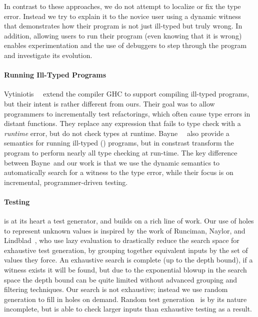 In contrast to these approaches, we do not attempt to localize or fix
the type error. Instead we try to explain it to the novice user using a
dynamic witness that demonstrates how their program is not just
ill-typed but truly wrong. In addition, allowing users to run their
program (even knowing that it is wrong) enables experimentation and the
use of debuggers to step through the program and investigate its
evolution.

\paragraph{Running Ill-Typed Programs}
\label{sec:running-ill-typed}
Vytiniotis~\etal~\cite{Vytiniotis2012-gh} extend the \haskell
compiler GHC to support compiling ill-typed programs, but their intent
is rather different from ours. Their goal was to allow programmers to
incrementally test refactorings, which often cause type errors in
distant functions. They replace any expression that fails to type
check with a \emph{runtime} error, but do not check types
at runtime.
%
Bayne~\etal~\cite{Bayne2011-cn} also provide a semantics for running
ill-typed (\java) programs, but in constrast transform the program to
perform nearly all type checking at run-time. The key difference between
Bayne~\etal and our work is that we use the dynamic semantics to
automatically search for a witness to the type error, while their focus
is on incremental, programmer-driven testing.

\paragraph{Testing}
\label{sec:testing}
\nanomaly is at its heart a test generator, and builds on a rich line of
work.
%
Our use of holes to represent unknown values is inspired by the work of
Runciman, Naylor, and Lindblad~\cite{Runciman2008-ka,Naylor2007-mi,Lindblad2007-oy},
%
who use lazy evaluation to drastically reduce the search space for
exhaustive test generation, by grouping together equivalent inputs by
the set of values they force. An exhaustive search is complete (up to
the depth bound), if a witness exists it will be found, but due to the
exponential blowup in the search space the depth bound can be quite
limited without advanced grouping and filtering techniques.
%
Our search is not exhaustive; instead we use random generation to fill
in holes on demand.
%
Random test generation~\cite{Claessen2000-lj,Csallner2004-bf,Pacheco2007-at}
%
is by its nature incomplete, but is able to check larger inputs than
exhaustive testing as a result.

